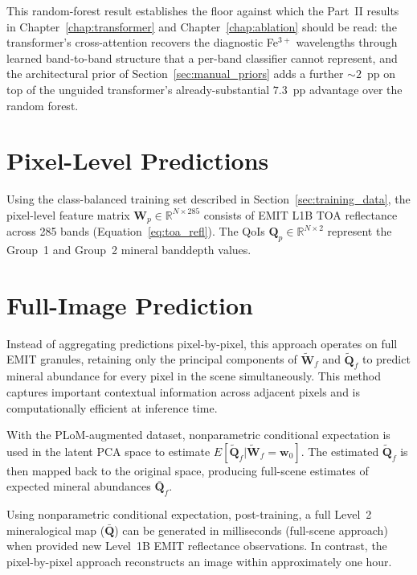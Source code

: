 \documentclass[11pt]{report}
\newcommand{\R}{\mathbb{R}}
\begin{document}
This random-forest result establishes the floor against which the Part~II results in Chapter~\ref{chap:transformer} and Chapter~\ref{chap:ablation} should be read: the transformer's cross-attention recovers the diagnostic Fe$^{3+}$ wavelengths through learned band-to-band structure that a per-band classifier cannot represent, and the architectural prior of Section~\ref{sec:manual_priors} adds a further $\sim$$2$~pp on top of the unguided transformer's already-substantial $7.3$~pp advantage over the random forest.

\section{Pixel-Level Predictions}

Using the class-balanced training set described in Section~\ref{sec:training_data}, the pixel-level feature matrix $\mathbf{W}_p \in \R^{N \times 285}$ consists of EMIT L1B TOA reflectance across 285 bands (Equation~\ref{eq:toa_refl}). The QoIs $\mathbf{Q}_p \in \R^{N \times 2}$ represent the Group~1 and Group~2 mineral banddepth values.


\section{Full-Image Prediction}
\label{sec:fullimage}

Instead of aggregating predictions pixel-by-pixel, this approach operates on full EMIT granules, retaining only the principal components of $\tilde{\mathbf{W}}_f$ and $\tilde{\mathbf{Q}}_f$ to predict mineral abundance for every pixel in the scene simultaneously. This method captures important contextual information across adjacent pixels and is computationally efficient at inference time.

With the PLoM-augmented dataset, nonparametric conditional expectation is used in the latent PCA space to estimate $E[\tilde{\mathbf{Q}}_f | \tilde{\mathbf{W}}_f = \mathbf{w}_0]$. The estimated $\tilde{\mathbf{Q}}_f$ is then mapped back to the original space, producing full-scene estimates of expected mineral abundances $\bar{\mathbf{Q}}_f$.

Using nonparametric conditional expectation, post-training, a full Level~2 mineralogical map ($\bar{\mathbf{Q}}$) can be generated in milliseconds (full-scene approach) when provided new Level~1B EMIT reflectance observations. In contrast, the pixel-by-pixel approach reconstructs an image within approximately one hour.
\end{document}
